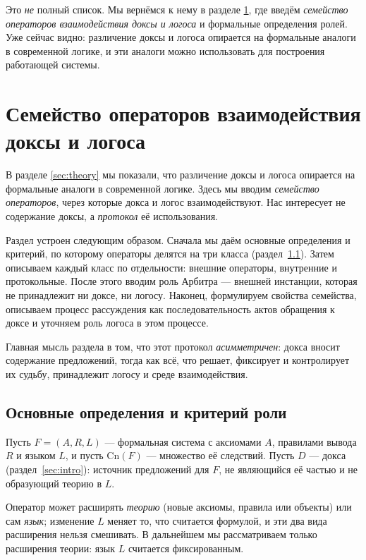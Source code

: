 \documentclass[12pt,a4paper]{article}
\begin{document}
Это \emph{не} полный список. Мы вернёмся к нему в разделе \ref{sec:operators}, где введём
\emph{семейство операторов взаимодействия доксы и логоса} и формальные
определения ролей. Уже сейчас видно: различение доксы и логоса опирается на
формальные аналоги в современной логике, и эти аналоги можно использовать для
построения работающей системы.

\section{Семейство операторов взаимодействия доксы и логоса}
\label{sec:operators}

В разделе \ref{sec:theory} мы показали, что различение доксы и логоса опирается на формальные
аналоги в современной логике. Здесь мы вводим \emph{семейство операторов}, через
которые докса и логос взаимодействуют. Нас интересует не содержание доксы, а
\emph{протокол} её использования.

Раздел устроен следующим образом. Сначала мы даём основные определения и
критерий, по которому операторы делятся на три класса (раздел~\ref{sec:roles}).
Затем описываем каждый класс по отдельности: внешние операторы, внутренние и
протокольные. После этого вводим роль Арбитра --- внешней инстанции, которая
не принадлежит ни доксе, ни логосу. Наконец, формулируем свойства семейства,
описываем процесс рассуждения как последовательность актов обращения к доксе
и уточняем роль логоса в этом процессе.

Главная мысль раздела в том, что этот протокол \emph{асимметричен}: докса
вносит содержание предложений, тогда как всё, что решает, фиксирует и
контролирует их судьбу, принадлежит логосу и среде взаимодействия.

\subsection{Основные определения и критерий роли}
\label{sec:roles}

Пусть $F = (A, R, L)$ --- формальная система с аксиомами $A$, правилами
вывода $R$ и языком $L$, и пусть $\mathrm{Cn}(F)$ --- множество её следствий.
Пусть $D$ --- докса (раздел~\ref{sec:intro}): источник предложений для $F$,
не являющийся её частью и не образующий теорию в $L$.

Оператор может расширять \emph{теорию} (новые аксиомы, правила или объекты)
или сам \emph{язык}; изменение $L$ меняет то, что считается формулой, и эти
два вида расширения нельзя смешивать. В дальнейшем мы рассматриваем только
расширения теории: язык $L$ считается фиксированным.
\end{document}

